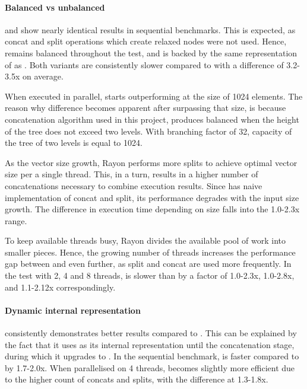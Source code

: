 

\paragraph*{Balanced vs unbalanced}
\rbvec{} and \rrbvec{} show nearly identical results in sequential benchmarks. This is expected, as concat and split operations which create relaxed nodes were not used. Hence, \rrbvec{} remains balanced throughout the test, and is backed by the same representation of \rrbtree{} as \rbvec{}. Both variants are consistently slower compared to \stdvec{} with a difference of 3.2-3.5x on average. 

When executed in parallel, \rrbvec{} starts outperforming \rbvec{} at the size of 1024 elements. The reason why difference becomes apparent after surpassing that size, is because concatenation algorithm used in this project, produces balanced \rbtree{} when the height of the tree does not exceed two levels. With branching factor of 32, capacity of the tree of two levels is equal to 1024. 

As the vector size growth, Rayon performs more splits to achieve optimal vector size per a single thread. This, in a turn, results in a higher number of concatenations necessary to combine execution results. Since \rbvec{} has naive implementation of concat and split, its performance degrades with the input size growth. The difference in execution time depending on size falls into the 1.0-2.3x range. 

To keep available threads busy, Rayon divides the available pool of work into smaller pieces. Hence, the growing number of threads increases the performance gap between \rbvec{} and \rrbvec{} even further, as split and concat are used more frequently. In the test with 2, 4 and 8 threads, \rbvec{} is slower than \rrbvec{} by a factor of 1.0-2.3x, 1.0-2.8x, and 1.1-2.12x correspondingly. 

\paragraph*{Dynamic internal representation}
\pvec{} consistently demonstrates better results compared to \rrbvec{}. This can be explained by the fact that it uses \stdvec{} as its internal representation until the concatenation stage, during which it upgrades to \rrbvec{}. In the sequential benchmark, \pvec{} is faster compared to \rrbvec{} by 1.7-2.0x. When parallelised on 4 threads, \rrbvec{} becomes slightly more efficient due to the higher count of concats and splits, with the difference at 1.3-1.8x. 


